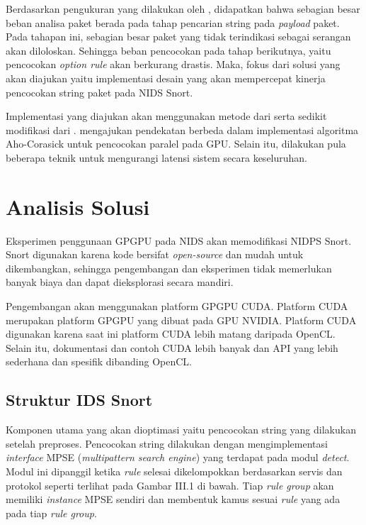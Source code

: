 
    Berdasarkan pengukuran yang dilakukan oleh \cite{kargus2012}, didapatkan bahwa sebagian besar beban analisa paket berada pada tahap pencarian string pada \emph{payload} paket. Pada tahapan ini, sebagian besar paket yang tidak terindikasi sebagai serangan akan diloloskan. Sehingga beban pencocokan pada tahap berikutnya, yaitu pencocokan \emph{option rule} akan berkurang drastis. Maka, fokus dari solusi yang akan diajukan yaitu implementasi desain yang akan mempercepat kinerja pencocokan string paket pada NIDS Snort. 
    
    Implementasi yang diajukan akan menggunakan metode dari \cite{lin2013} serta sedikit modifikasi dari \cite{gnort2008}. \cite{lin2013} mengajukan pendekatan berbeda dalam implementasi algoritma Aho-Corasick untuk pencocokan paralel pada GPU. Selain itu, dilakukan pula beberapa teknik untuk mengurangi latensi sistem secara keseluruhan. 

  \section{Analisis Solusi}

    Eksperimen penggunaan GPGPU pada NIDS akan memodifikasi NIDPS Snort. Snort digunakan karena kode bersifat \emph{open-source} dan mudah untuk dikembangkan, sehingga pengembangan dan eksperimen tidak memerlukan banyak biaya dan dapat dieksplorasi secara mandiri. 

    Pengembangan akan menggunakan platform GPGPU CUDA. Platform CUDA merupakan platform GPGPU yang dibuat pada GPU NVIDIA. Platform CUDA digunakan karena saat ini platform CUDA lebih matang daripada OpenCL. Selain itu, dokumentasi dan contoh CUDA lebih banyak dan API yang lebih sederhana dan spesifik dibanding OpenCL.

    \subsection{Struktur IDS Snort}

      Komponen utama yang akan dioptimasi yaitu pencocokan string yang dilakukan setelah preproses. Pencocokan string dilakukan dengan mengimplementasi \emph{interface} MPSE (\emph{multipattern search engine}) yang terdapat pada modul \emph{detect}. Modul ini dipanggil ketika \emph{rule} selesai dikelompokkan berdasarkan servis dan protokol seperti terlihat pada Gambar III.1 di bawah. Tiap \emph{rule group} akan memiliki \emph{instance} MPSE sendiri dan membentuk kamus sesuai \emph{rule} yang ada pada tiap \emph{rule group}.

